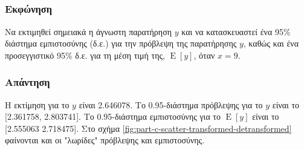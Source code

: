 \documentclass{article}
\DeclareMathOperator{\E}{\mathrm{E}}
\begin{document}
\subsection{}
\subsubsection*{Εκφώνηση}
Να εκτιμηθεί σημειακά η άγνωστη παρατήρηση \(y\) και να κατασκευαστεί ένα
95\% διάστημα εμπιστοσύνης (δ.ε.) για την πρόβλεψη της παρατήρησης \(y\),
καθώς και ένα προσεγγιστικό 95\% δ.ε. για τη μέση τιμή της, \(\E[y]\), όταν \(x = 9\).
\subsubsection*{Απάντηση}
Η εκτίμηση για το \(y\) είναι 2.646078.
Το 0.95-διάστημα πρόβλεψης για το \(y\) είναι το [2.361758, 2.803741].
Το 0.95-διάστημα εμπιστοσύνης για το \(\E[y]\) είναι το [2.555063 2.718475].
Στο σχήμα \ref{fig:part-c-scatter-transformed-detransformed} φαίνονται και οι "λωρίδες" πρόβλεψης και εμπιστοσύνης.
\end{document}
